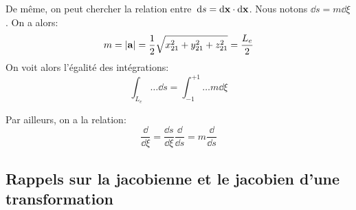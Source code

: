 \medskipvm
De même, on peut chercher la relation entre~$\dd s=\dd\VV{x}\cdot\dd\VV{x}$. Nous notons $\dd s=m \dd \xi$. On a alors: 
\begin{equation}m=|\VV{a}| = \frac12 \sqrt{x_{21}^2+y_{21}^2+z_{21}^2} = \frac{L_e}2 \end{equation}
On voit alors l'égalité des intégrations:
\begin{equation}\int_{L_e} \ldots \dd s = \int_{-1}^{+1}\ldots m \dd \xi\end{equation}

\medskipvm
Par ailleurs, on a la relation:
\begin{equation} \frac{\dd}{ \dd \xi} = \frac{\dd s}{ \dd \xi}\frac{\dd}{\dd s}=m\frac{\dd}{\dd s}\end{equation}

\medskip
\subsection{Rappels sur la jacobienne et le jacobien d'une transformation}


